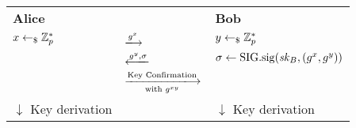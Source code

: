 \begin{tabular}{lC{3cm}l}
    \textbf{Alice} &  & \textbf{Bob}\\
    $x\gets_\$\mathbb{Z}_p^*$ & $\xlongrightarrow{g^x}$ & $y\gets_\$\mathbb{Z}_p^*$ \\
    & $\xlongleftarrow{g^y,\sigma}$ & $\sigma\gets\mathrm{SIG}.\mathrm{sig}(\mathit{sk}_B,(g^x, g^y))$ \\
    & $\xlongrightarrow[\text{with }g^{xy}]{\text{Key Confirmation}}$ & \\
    \parbox[b][][t]{2.5cm}{\centering$\downarrow$\\Key derivation} &  & \parbox[b][][t]{2.5cm}{\centering$\downarrow$\\Key derivation}
\end{tabular}